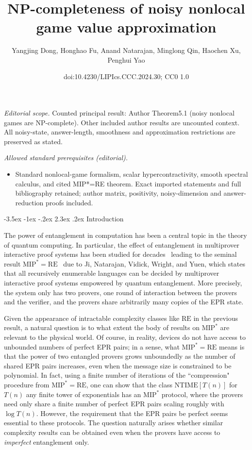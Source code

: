 \documentclass[10pt,a4paper]{article}
\title{NP-completeness of noisy nonlocal game value approximation}
\author{Yangjing Dong, Honghao Fu, Anand Natarajan, Minglong Qin, Haochen Xu, Penghui Yao}
\date{doi:10.4230/LIPIcs.CCC.2024.30; CC0 1.0}
\makeatletter
\renewcommand{\section}{\@startsection {section}{1}{\z@}%
             {-3.5ex \@plus -1ex \@minus -.2ex}%
             {2.3ex \@plus .2ex}%
             {\normalfont\Large\scshape\bfseries}}
\theoremstyle{plain}
\theoremstyle{definition}
\newcommand{\1}{\mathbb{1}} %
\newcommand{\MIP}{\mathrm{MIP}}
\newcommand{\RE}{\mathrm{RE}}
\makeatother
\begin{document}
\maketitle
\noindent\textit{Editorial scope.} Counted principal result: Author Theorem5.1 (noisy nonlocal games are NP-complete). Other included author results are uncounted context. All noisy-state, answer-length, smoothness and approximation restrictions are preserved as stated.\par\medskip
\noindent\textit{Allowed standard prerequisites (editorial).}\begin{itemize}
\item Standard nonlocal-game formalism, scalar hypercontractivity, smooth spectral calculus, and cited MIP*=RE theorem. Exact imported statements and full bibliography retained; author matrix, positivity, noisy-dimension and answer-reduction proofs included.
\end{itemize}\medskip
 \section{Introduction}

The power of entanglement in computation has been a central topic in the theory of quantum computing. In particular, the effect of entanglement in multiprover interactive proof systems has been studied for decades~\cite{doi:10.1137/090772885,doi:10.1137/090751293,Ito:2009:OTO:1602931.1603187,Ji:2017:CQM:3055399.3055441,Slo:2020,slofstra:2019}  leading to the seminal result $\mathrm{MIP}^*=\mathrm{RE}$~\cite{JNVWYuen'20,JNVWY'20} due to Ji, Natarajan, Vidick, Wright, and Yuen, which states that all recursively enumerable languages can be decided by multiprover interactive proof systems empowered by quantum entanglement. More precisely, the system only has two provers, one round of interaction between the provers and the verifier, and the provers share arbitrarily many copies of the EPR state.



Given the appearance of intractable complexity classes like $\RE$ in the previous result, a natural question is to what extent the body of results on $\MIP^*$ are relevant to the physical world. Of course, in reality, devices do not have access to unbounded numbers of perfect EPR pairs; in a sense, what $\MIP^* = \RE$ means is that the power of two entangled provers grows unboundedly as the number of shared EPR pairs increases, even when the message size is constrained to be polynomial. In fact, using a finite number of iterations of the ``compression" procedure from $\MIP^* = \RE$, one can show that the class $\mathrm{NTIME}[T(n)]$ for $T(n)$ any finite tower of exponentials has an $\MIP^*$ protocol, where the provers need only share a finite number of perfect EPR pairs scaling roughly with $\log T(n)$. However, the requirement that the EPR pairs be perfect seems essential to these protocols. The question naturally arises whether similar complexity results can be obtained even when the provers have access to \emph{imperfect} entanglement only.
\end{document}
